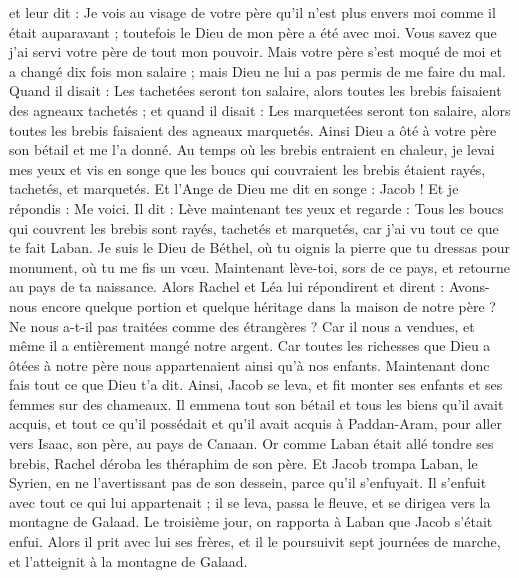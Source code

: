 \begin{multicols}{2}
et leur dit : Je vois au visage de votre père qu'il n'est plus envers moi comme il était auparavant ; toutefois le Dieu de mon père a été avec moi.
Vous savez que j'ai servi votre père de tout mon pouvoir.
Mais votre père s'est moqué de moi et a changé dix fois mon salaire ; mais Dieu ne lui a pas permis de me faire du mal.
Quand il disait : Les tachetées seront ton salaire, alors toutes les brebis faisaient des agneaux tachetés ; et quand il disait : Les marquetées seront ton salaire, alors toutes les brebis faisaient des agneaux marquetés.
Ainsi Dieu a ôté à votre père son bétail et me l'a donné.
Au temps où les brebis entraient en chaleur, je levai mes yeux et vis en songe que les boucs qui couvraient les brebis étaient rayés, tachetés, et marquetés.
Et l'Ange de Dieu me dit en songe : Jacob ! Et je répondis : Me voici.
Il dit : Lève maintenant tes yeux et regarde : Tous les boucs qui couvrent les brebis sont rayés, tachetés et marquetés, car j'ai vu tout ce que te fait Laban.
Je suis le Dieu de Béthel, où tu oignis la pierre que tu dressas pour monument, où tu me fis un vœu. Maintenant lève-toi, sors de ce pays, et retourne au pays de ta naissance.
Alors Rachel et Léa lui répondirent et dirent : Avons-nous encore quelque portion et quelque héritage dans la maison de notre père ?
Ne nous a-t-il pas traitées comme des étrangères ? Car il nous a vendues, et même il a entièrement mangé notre argent.
Car toutes les richesses que Dieu a ôtées à notre père nous appartenaient ainsi qu'à nos enfants. Maintenant donc fais tout ce que Dieu t'a dit.
Ainsi, Jacob se leva, et fit monter ses enfants et ses femmes sur des chameaux.
Il emmena tout son bétail et tous les biens qu'il avait acquis, et tout ce qu'il possédait et qu'il avait acquis à Paddan-Aram, pour aller vers Isaac, son père, au pays de Canaan.
Or comme Laban était allé tondre ses brebis, Rachel déroba les théraphim de son père.
Et Jacob trompa Laban, le Syrien, en ne l'avertissant pas de son dessein, parce qu'il s'enfuyait.
Il s'enfuit avec tout ce qui lui appartenait ; il se leva, passa le fleuve, et se dirigea vers la montagne de Galaad.
Le troisième jour, on rapporta à Laban que Jacob s'était enfui.
Alors il prit avec lui ses frères, et il le poursuivit sept journées de marche, et l'atteignit à la montagne de Galaad.

\end{multicols}
